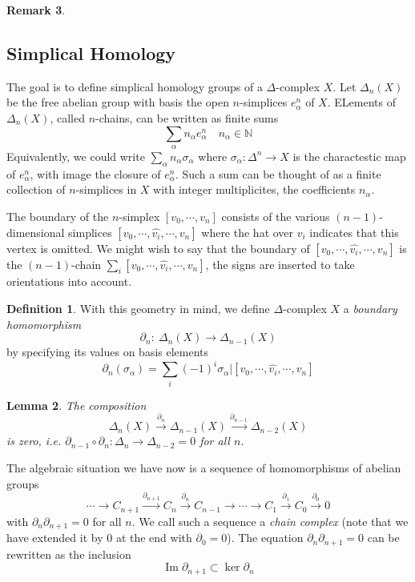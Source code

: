 \documentclass[11pt,a4paper]{article}
\theoremstyle{definition}
\newtheorem{definition}{Definition}[section]
\newtheorem{remark}[definition]{Remark}
\theoremstyle{plain}
\newtheorem{lemma}[definition]{Lemma}
\theoremstyle{remark}
\begin{document}
\begin{remark}
\subsection{Simplical Homology} 

The goal is to define simplical homology groups of a $\Delta$-complex $X$. Let 
$\Delta_n (X)$ be the free abelian group with basis the open $n$-simplices $e^n_\alpha$ of $X$. 
ELements of $\Delta_n (X)$, called $n$-chains, can be written as finite sums 
$$\sum_\alpha n_\alpha e^n_\alpha \quad n_\alpha \in \mathbb{N}$$
Equivalently, we could write $\sum_\alpha n_\alpha \sigma_\alpha$ where $\sigma_\alpha \colon \Delta^n \to X$ 
is the charactestic map of $e^n_\alpha$, with image the closure of $e^n_\alpha$. Such 
a sum can be thought of as a finite collection of $n$-simplices in $X$ with integer multiplicites, the coefficients 
$n_\alpha$. 

The boundary of the $n$-simplex $[v_0, \cdots, v_n]$ consists of the various  $(n-1)$-dimensional 
simplices $[v_0, \cdots, \hat{v_i}, \cdots, v_n]$ where the hat over $v_i$ indicates that this 
vertex is omitted. 
We might wish to say that the boundary of $[v_0, \cdots, \hat{v_i}, \cdots, v_n]$ is the $(n-1)$-chain 
$\sum_i [v_0, \cdots, \hat{v_i}, \cdots, v_n]$, the signs are inserted to take orientations into account. 

\begin{definition}
  With this geometry in mind, we define $\Delta$-complex $X$ a \emph{boundary homomorphism} 
  $$\partial_n \colon \: \Delta_n (X) \to \Delta_{n-1} (X)$$
  by specifying its values on basis elements 
  $$\partial_n (\sigma_\alpha) = \sum_i (-1)^i \sigma_\alpha | [v_0, \cdots, \hat{v_i}, \cdots, v_n]$$  
\end{definition}

\begin{lemma}
  The composition 
  $$\Delta_n (X) \xrightarrow{\partial_n} \Delta_{n-1}(X) \xrightarrow{\partial_{n-1}} \Delta_{n-2} (X)$$
  is zero, i.e. $\partial_{n-1} \circ \partial_n \colon \Delta_n \to \Delta_{n-2} = 0$ for all $n$.
\end{lemma}

The algebraic situation we have now is a sequence of homomorphisms of abelian groups 
$$\cdots \rightarrow C_{n+1} \xrightarrow{\partial_{n+1}} C_n \xrightarrow{\partial_n} C_{n-1} \rightarrow \cdots 
\rightarrow C_1 \xrightarrow{\partial_1} C_0 \xrightarrow{\partial_0} 0$$
with $\partial_n \partial_{n+1} = 0$ for all $n$. We call such a sequence a 
\emph{chain complex} (note that we have extended it by $0$ at the end with $\partial_0 = 0$). 
The equation $\partial_n \partial_{n+1} = 0$ can be rewritten as the inclusion 
$$\operatorname{Im} \partial_{n+1} \subset \ker \partial_n$$


\end{remark}
\end{document}
